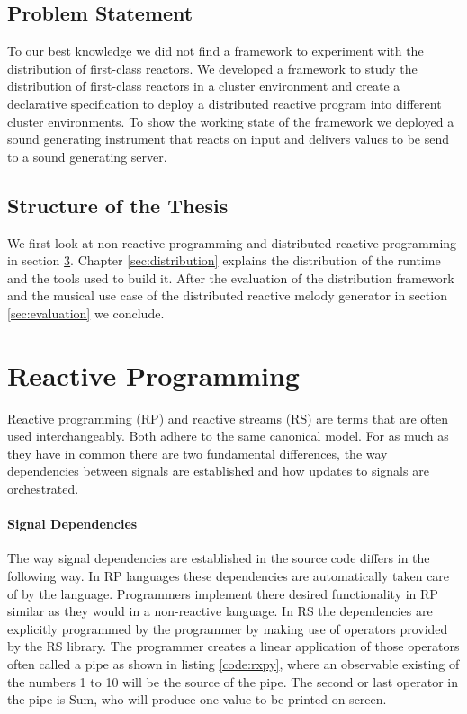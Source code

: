 \documentclass[a4paper]{book}
\begin{document}
\section{Problem Statement}
To our best knowledge we did not find a framework to experiment with the distribution of first-class reactors. We developed a framework to study the distribution of first-class reactors in a cluster environment and create a declarative specification to deploy a distributed reactive program into different cluster environments. To show the working state of the framework we deployed a sound generating instrument that reacts on input and delivers values to be send to a sound generating server.  

\section{Structure of the Thesis}
We first look at non-reactive programming and distributed reactive programming in section \ref{sec:rp}. Chapter \ref{sec:distribution} explains the distribution of the runtime and the tools used to build it. After the evaluation of the distribution framework and the musical use case of the distributed reactive melody generator in section \ref{sec:evaluation} we conclude. 


\chapter{Reactive Programming} \label{sec:rp}

Reactive programming (RP) and reactive streams (RS) are terms that are often used interchangeably. Both adhere to the same canonical model.  For as much as they have in common there are two fundamental differences, the way dependencies between signals are established and how updates to signals are orchestrated.

\subsubsection{Signal Dependencies}
The way signal dependencies are established in the source code differs in the following way. In RP languages these dependencies are automatically taken care of by the language. Programmers implement there desired functionality in RP similar as they would in a non-reactive language. In RS the dependencies are explicitly programmed by the programmer by making use of operators provided by the RS library. The programmer creates a linear application of those operators often called a pipe as shown in listing \ref{code:rxpy}, where an observable existing of the numbers 1 to 10 will be the source of the pipe. The second or last operator in the pipe is Sum, who will produce one value to be printed on screen.
\end{document}
